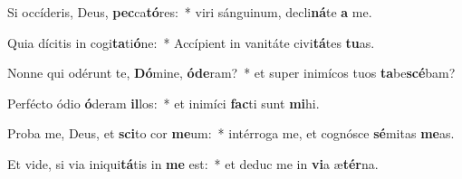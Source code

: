 \item Si occíderis, Deus, \textbf{pec}ca\textbf{tó}res:~* viri sánguinum, decli\textbf{ná}te \textbf{a} me.
\item Quia dícitis in cogi\textbf{ta}ti\textbf{ó}ne:~* Accípient in vanitáte civi\textbf{tá}tes \textbf{tu}as.
\item Nonne qui odérunt te, \textbf{Dó}mine, \textbf{ó}\textbf{de}ram?~* et super inimícos tuos \textbf{ta}be\textbf{scé}bam?
\item Perfécto ódio \textbf{ó}deram \textbf{il}los:~* et inimíci \textbf{fac}ti sunt \textbf{mi}hi.
\item Proba me, Deus, et \textbf{sci}to cor \textbf{me}um:~* intérroga me, et cognósce \textbf{sé}mitas \textbf{me}as.
\item Et vide, si via iniqui\textbf{tá}tis in \textbf{me} est:~* et deduc me in \textbf{vi}a æ\textbf{tér}na.
